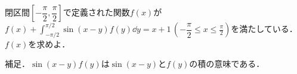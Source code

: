閉区間$\left[-\dfrac{\pi}{2},\dfrac{\pi}{2}\right]$で定義された関数$f(x)$が${\displaystyle f(x)+\int_{-\pi/2}^{\pi/2}\sin (x-y)f(y)\dd y=x+1\, \left(-\dfrac{\pi}{2}\le x \le \frac{\pi}{2}\right)}$を満たしている．
$f(x)$を求めよ．

補足．$\sin (x-y)f(y)$は$\sin (x-y)$と$f(y)$の積の意味である．
